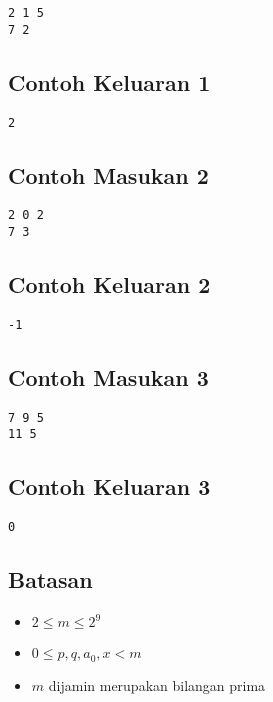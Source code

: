 \documentclass{article}
\begin{document}
\begin{lstlisting}
2 1 5
7 2
\end{lstlisting}

\subsection*{Contoh Keluaran 1}

\begin{lstlisting}
2
\end{lstlisting}

\subsection*{Contoh Masukan 2}

\begin{lstlisting}
2 0 2
7 3
\end{lstlisting}

\subsection*{Contoh Keluaran 2}

\begin{lstlisting}
-1
\end{lstlisting}

\subsection*{Contoh Masukan 3}

\begin{lstlisting}
7 9 5
11 5
\end{lstlisting}

\subsection*{Contoh Keluaran 3}

\begin{lstlisting}
0
\end{lstlisting}

\subsection*{Batasan}

\begin{itemize}
  \item $2 \leq m \leq 2^9$
  \item $0 \leq p, q, a_0, x < m$
  \item $m$ dijamin merupakan bilangan prima
\end{itemize}
\end{document}

